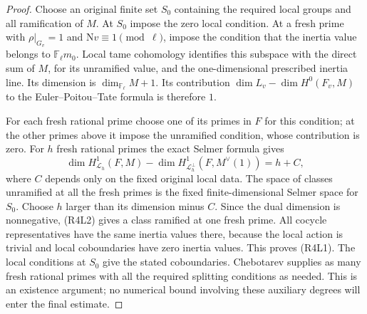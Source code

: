 \begin{proof}
Choose an original finite set \(S_0\) containing the required
local groups and all ramification of \(M\).
At \(S_0\) impose the zero local condition.
At a fresh prime with \(\rho|_{G_v}=1\) and
\(\mathrm Nv\equiv1\pmod\ell\), impose the condition
that the inertia value belongs to \(\mathbb F_\ell m_0\).
Local tame cohomology identifies this subspace with the
direct sum of \(M\), for its unramified value, and the
one-dimensional prescribed inertia line. Its dimension is
\(\dim_{\mathbb F_\ell}M+1\).
Its contribution
\(\dim L_v-\dim H^0(F_v,M)\) to the
Euler--Poitou--Tate formula is therefore \(1\).

For each fresh rational prime choose one of its primes in \(F\)
for this condition; at the other primes above it impose the
unramified condition, whose contribution is zero.
For \(h\) fresh rational primes the exact Selmer formula gives
\[
 \dim H^1_{\mathcal L_h}(F,M)
       -\dim H^1_{\mathcal L_h^\perp}(F,M^\vee(1))
                         =h+C,                            \tag{R4L2}
\]
where \(C\) depends only on the fixed original local data.
The space of classes unramified at all the fresh primes is
the fixed finite-dimensional Selmer space for \(S_0\).
Choose \(h\) larger than its dimension minus \(C\).
Since the dual dimension is nonnegative, (R4L2) gives a
class ramified at one fresh prime.
All cocycle representatives have the same inertia values
there, because the local action is trivial and local
coboundaries have zero inertia values.
This proves (R4L1).
The local conditions at \(S_0\) give the stated coboundaries.
Chebotarev supplies as many fresh rational primes with all
the required splitting conditions as needed.
This is an existence argument; no numerical bound involving
these auxiliary degrees will enter the final estimate.
\end{proof}

